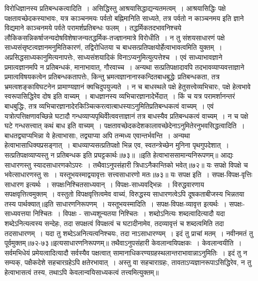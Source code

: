 विरोधिज्ञानस्य प्रतिबन्धकत्वादिति~।
असिद्धिस्तु आश्रयासिद्धाद्यन्यतमत्वम्~।
आश्रयासिद्धिः पक्षे पक्षतावच्छेदकस्याभावः, यत्र काञ्चनमयः पर्वतो बह्निमानिति साध्यते, तत्र पर्वतो न काञ्चनमय इति ज्ञाने विद्यमाने काञ्चनमये पर्वते
परामर्शप्रतिबन्धः फलम्~। तद्धर्मिकतदभावनिश्चये लौकिकसन्निकर्षाजन्यदोषविशेषाजन्यतद्धर्मिक-तज्ज्ञानमात्रे विरोधीति~।
न तु संशयसाधारणं पक्षे साध्यसंसृष्टत्वज्ञानमनुमितिकारणं, तद्विरोधितया च बाधसत्प्रतिपक्षयोर्हेत्वाभावत्वमिति युक्तम्~। अप्रसिद्धसाध्यकानुमित्यनापत्तेः,
साध्यसंशयादिकं विनाऽप्यनुमित्युत्पत्तेश्च~।
एवं साध्याभावज्ञाने प्रमात्वज्ञानमपि न प्रतिबन्धकं, मानाभावात्, गौरवाच्च~। अन्यथा सत्प्रतिपक्षादावपि तदभावव्याप्यवत्ताज्ञाने प्रमात्वविषयकत्वेन प्रतिबन्धकतापत्तेः,
किन्तु भ्रमत्वज्ञानानास्कन्दितबाधबुद्धेः प्रतिबन्धकता, तत्र भ्रमत्वशङ्काविघटनेन प्रामाण्यज्ञानं क्वचिदुपयुज्यते~।
न च बाधस्थले पक्षे हेतुसत्त्वेव्यभिचारः, पक्षे हेत्वभावे स्वरूपासिद्धिरेव दोष इति वाच्यम्~। बाधज्ञानस्य व्यभिचारज्ञानादेर्भेदात्~।
किं च यत्र परामर्शानन्तरं बाधबुद्धिः, तत्र व्यभिचारज्ञानादेरकिञ्चित्करत्वात्बाधस्याऽनुमितिप्रतिबन्धकत्वं वाच्यम्~। एवं यत्रोत्पत्तिक्षणावच्छिन्ने घटादौ
गन्धव्याप्यपृथिवीेत्ववत्ताज्ञानं तत्र बाधस्यैव प्रतिबन्धकत्वं वाच्यम्~। न च पक्षे घटे गन्धसत्त्वात् कथं बाध इति वाच्यम्~। पक्षतावच्छेदकदेशकालावच्छेदेनाऽनुमितेरनुभवसिद्धत्वादिति~।
बाधतद्व्याप्यभिन्ना ये हेत्वाभासाः, तद्व्याप्या अपि तन्मध्य एवान्तर्भवन्ति~। अन्यथा हेत्वाभासाधिक्यप्रसङ्गात्~। बाधव्याप्यसत्प्रतिपक्षो भिन्न एव, स्वतन्त्रेच्छेन मुनिना
पृथगुपदेशात्~। सत्प्रतिपक्षव्याप्यस्तु न प्रतिबन्धक इति प्रघट्टकार्थः॥७३॥
॥इति हेत्वाभाससामान्यनिरूपणम्॥
आद्यः साधारणस्तु स्यादसाधारणकोऽपरः~।
तथैवाऽनुपसंहारी त्रिधाऽनैकान्तिको भवेत्॥७२॥
यः सपक्षे विपक्षे च भवेत्साधारणस्तु सः~।
यस्तूभयस्माद्वयावृत्तः सत्त्वसाधारणो मतः॥७३॥
यः सपक्ष इति~। सपक्ष-विपक्ष-वृत्तिः साधारण इत्यर्थः~। सपक्षःनिश्चितसाध्यवान्~। विपक्षः-साध्यवद्भिन्नः~। विरुद्धवारणाय सपक्षवृत्तित्वमुक्तम्~।
वस्तुतो विपक्षवृत्तित्वमेव वाच्यं, विरुद्धस्य साधारणत्वेऽपि दूषकताबीजस्य भिन्नतया तस्य पार्थक्यात्॥इति साधारणनिरूपणम्~।
यस्तूभयस्मादिति~। सपक्ष-विपक्ष-व्यावृत्त इत्यर्थः~। सपक्षः-साध्यवत्तया निश्चितः~। विपक्षः - साध्यशून्यतया निश्चितः~। शब्दोऽनित्यः शब्दत्वादित्यादौ यदा
शब्देऽनित्यत्वस्य सन्देहः, तदा सपक्षत्वं विपक्षत्वं च घटादीनामेव, तदव्यावृत्तं च शब्दत्वमिति तदा तदसाधारणम्~। यदा तु शब्देऽअनित्यत्वनिश्चयः, तदा नाऽसाधारण्यम्~।
इदं तु प्राचां मतम्~। नवीनमतं तु पूर्वमुक्तम्॥७२-७३॥इत्यसाधारणनिरूपणम्॥
तथैवाऽनुपसंहारी केवलान्वयिपक्षकः~।
केवलान्वयीति~। सर्वमभिधेयं प्रमेयत्वादित्यादौ सर्वस्यैव पक्षत्वात् सामानाधिकरण्यग्रहस्थलान्तराभावान्नाऽनुमितिः~। इदं तु न सम्यक्, पक्षैकदेशे सहचारग्रहेऽपि
क्षतेरभावात्~। अस्तु वा सहचाराग्रहः, तावताऽप्यज्ञानरूपाऽसिद्धिरेव, न तु हेत्वाभासत्वं तस्य, तथाऽपि केवलान्वयिसाध्यकत्वं तत्त्वमित्युक्तम्॥
